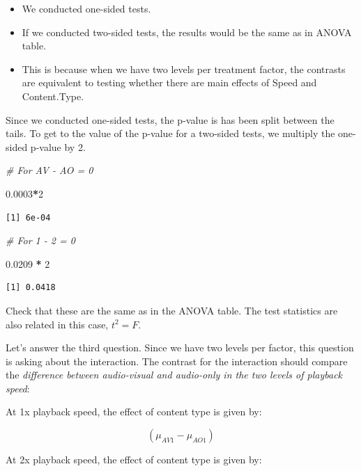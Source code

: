 \documentclass[
  letterpaper,
]{book}
\newenvironment{Shaded}{\begin{snugshade}}{\end{snugshade}}
\newcommand{\CommentTok}[1]{\textcolor[rgb]{0.56,0.35,0.01}{\textit{#1}}}
\newcommand{\DecValTok}[1]{\textcolor[rgb]{0.00,0.00,0.81}{#1}}
\newcommand{\FloatTok}[1]{\textcolor[rgb]{0.00,0.00,0.81}{#1}}
\newcommand{\SpecialCharTok}[1]{\textcolor[rgb]{0.81,0.36,0.00}{\textbf{#1}}}
\providecommand{\tightlist}{%
  \setlength{\itemsep}{0pt}\setlength{\parskip}{0pt}}\usepackage{longtable,booktabs,array}
\begin{document}
\begin{itemize}
\tightlist
\item
  We conducted one-sided tests.
\item
  If we conducted two-sided tests, the results would be the same as in
  ANOVA table.
\item
  This is because when we have two levels per treatment factor, the
  contrasts are equivalent to testing whether there are main effects of
  Speed and Content.Type.
\end{itemize}

Since we conducted one-sided tests, the p-value is has been split
between the tails. To get to the value of the p-value for a two-sided
tests, we multiply the one-sided p-value by 2.

\begin{Shaded}
\begin{Highlighting}[]
\CommentTok{\# For AV {-} AO = 0}

\FloatTok{0.0003}\SpecialCharTok{*}\DecValTok{2}
\end{Highlighting}
\end{Shaded}

\begin{verbatim}
[1] 6e-04
\end{verbatim}

\begin{Shaded}
\begin{Highlighting}[]
\CommentTok{\# For 1 {-} 2 = 0}

\FloatTok{0.0209} \SpecialCharTok{*} \DecValTok{2}
\end{Highlighting}
\end{Shaded}

\begin{verbatim}
[1] 0.0418
\end{verbatim}

Check that these are the same as in the ANOVA table. The test statistics
are also related in this case, \(t^2 = F\).

Let's answer the third question. Since we have two levels per factor,
this question is asking about the interaction. The contrast for the
interaction should compare the \emph{difference between audio-visual and
audio-only in the two levels of playback speed}:

At 1x playback speed, the effect of content type is given by:

\[
(\mu_{AV1} - \mu_{AO1})
\]

At 2x playback speed, the effect of content type is given by:
\end{document}
